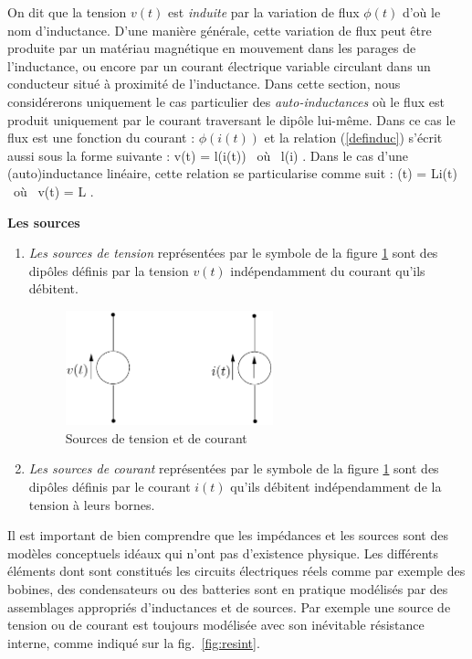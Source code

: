 \begin{description}
\begin{enumerate}
\eeqn
On dit que la tension $v(t)$ est {\it induite} par la variation de flux $\phi(t)$ d'où le nom d'inductance. D'une manière générale, cette variation de flux peut être produite par un matériau magnétique en mouvement dans les parages de l'inductance, ou encore par un courant électrique variable circulant dans un conducteur situé à proximité de l'inductance. Dans cette section, nous considérerons uniquement le cas particulier des {\it auto-inductances} où le flux est produit uniquement par le courant traversant le dipôle lui-même. Dans ce cas le flux est une fonction du courant :  $\phi(i(t))$ et la relation (\ref{definduc}) s'écrit aussi sous la forme suivante :
\eqnn
v(t) =  l(i(t)) 
\mbox{ où } l(i) \triangleq  {}.
\eeqnn
Dans le cas d'une (auto)inductance linéaire, cette relation se
particularise comme suit :
\eqnn
\phi(t) = Li(t) \;\; \mbox{ où } v(t) = L .
\eeqnn
\end{enumerate}
\item{\bf Les sources}
\begin{enumerate}
\item {\em Les sources de tension} représentées par le symbole de
la figure \ref{fig:sources} sont des dip{ô}les définis par la
tension $v(t)$ indépendam\-ment du courant qu'ils débitent.
\begin{figure}[htbp]
\begin{center}
\includegraphics[width=6cm]{sources}
\caption{Sources de tension et de courant}
\label{fig:sources}
\end{center}
\end{figure}
\item{\em Les sources de courant} représentées par le symbole de
la figure \ref{fig:sources} sont des dip{ô}les définis par le
courant $i(t)$ qu'ils débitent indépendamment de la tension à
leurs bornes. 
\end{enumerate} 
\end{description}
Il est important de bien comprendre que les impédances et les sources sont des modèles conceptuels idéaux qui n'ont pas d'existence physique. Les différents éléments dont sont constitués les circuits électriques réels comme par exemple des bobines, des condensateurs ou des batteries sont en pratique modélisés par des assemblages appropriés d'inductances et de sources. Par exemple une source de tension ou de courant est toujours modélisée avec son inévitable résistance interne, comme indiqué sur la fig.~\ref{fig:resint}.

